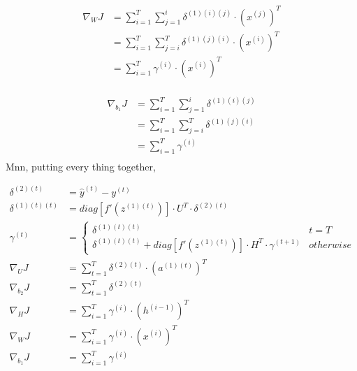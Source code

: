 \documentclass{article}
\begin{document}
	\begin{equation}
	\begin{aligned}
		\nabla_{W} J &= \sum_{i=1}^{T} \sum_{j=1}^{i} \delta^{(1)(i)(j)} \cdot  (x^{(j)})^T\\
		&= \sum_{i=1}^{T} \sum_{j=i}^{T} \delta^{(1)(j)(i)} \cdot  (x^{(i)})^T\\
		&= \sum_{i=1}^{T} \gamma^{(i)} \cdot  (x^{(i)})^T\\
	\end{aligned}
	\end{equation}
	
	\begin{equation}
	\begin{aligned}
		\nabla_{b_1} J &= \sum_{i=1}^{T} \sum_{j=1}^{i} \delta^{(1)(i)(j)} \\
		&= \sum_{i=1}^{T} \sum_{j=i}^{T} \delta^{(1)(j)(i)} \\
		&= \sum_{i=1}^{T} \gamma^{(i)} \\
	\end{aligned}
	\end{equation}
	Mnn, putting every thing together,
	\begin{framed}
	\begin{align}
		\delta^{(2)(t)} &= \hat{y}^{(t)} - y^{(t)} \\	
		\delta^{(1)(t)(t)} &= diag[f'(z^{(1)(t)})] \cdot U^T \cdot \delta^{(2)(t)}\\
		\gamma^{(t)} &= 
		\begin{cases}
		\delta^{(1)(t)(t)} &t=T \\
		\delta^{(1)(t)(t)} + diag[f'(z^{(1)(t)})] \cdot H^T \cdot \gamma^{(t+1)} & otherwise
		\end{cases}\\
		\nabla_U J &= \sum_{t=1}^{T}\delta^{(2)(t)} \cdot (a^{(1)(t)})^T\\
		\nabla_{b_2} J &= \sum_{t=1}^{T}\delta^{(2)(t)} \\
		\nabla_H J &= \sum_{i=1}^{T} \gamma^{(i)} \cdot  (h^{(i-1)})^T\\
		\nabla_W J &= \sum_{i=1}^{T} \gamma^{(i)} \cdot  (x^{(i)})^T\\
		\nabla_{b_1} J &= \sum_{i=1}^{T} \gamma^{(i)} \\
	\end{align}
	\end{framed}
\end{document}
